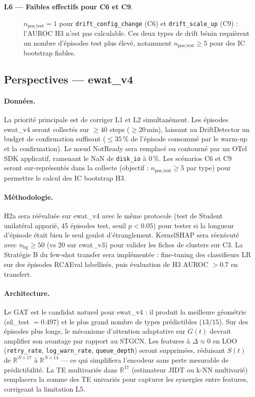 \begin{description}
  \item[\textbf{L6 --- Faibles effectifs pour C6 et C9}.]
    $n_\text{pos\_test} = 1$ pour \texttt{drift\_config\_change} (C6) et
    \texttt{drift\_scale\_up} (C9) : l'AUROC H3 n'est pas calculable.
    Ces deux types de drift bénin requièrent un nombre d'épisodes test plus élevé,
    notamment $n_\text{pos\_test} \geq 5$ pour des IC bootstrap fiables.
\end{description}

\subsection{Perspectives --- ewat\_v4}
\label{sec:ewat_v4}

\paragraph{Données.}
La priorité principale est de corriger L1 et L2 simultanément. Les épisodes ewat\_v4
seront collectés sur $\geq 40$ steps ($\geq 20$\,min), laissant au DriftDetector un
budget de confirmation suffisant ($\leq 35$\,\% de l'épisode consommé par le warm-up
et la confirmation). Le nœud NotReady sera remplacé ou contourné par un OTel SDK
applicatif, ramenant le NaN de \texttt{disk\_io} à $0$\,\%.
Les scénarios C6 et C9 seront sur-représentés dans la collecte (objectif :
$n_\text{pos\_test} \geq 5$ par type) pour permettre le calcul des IC bootstrap H3.

\paragraph{Méthodologie.}
H2a sera réévaluée sur ewat\_v4 avec le même protocole (test de Student unilatéral
apparié, 45 épisodes test, seuil $p < 0.05$) pour tester si la longueur d'épisode
était bien le seul goulot d'étranglement. KernelSHAP sera réexécuté avec $n_\text{bg} \geq 50$
(vs 20 sur ewat\_v3) pour valider les fiches de clusters sur C3.
La Stratégie B du few-shot transfer sera implémentée : fine-tuning des classifieurs LR
sur des épisodes RCAEval labellisés, puis évaluation de H3 AUROC $> 0.7$ en transfert.

\paragraph{Architecture.}
Le GAT est le candidat naturel pour ewat\_v4 : il produit la meilleure géométrie
(sil\_test $= 0.497$) et le plus grand nombre de types prédictibles ($13/15$).
Sur des épisodes plus longs, le mécanisme d'attention adaptative sur $G(t)$ devrait
amplifier son avantage par rapport au STGCN.
Les features à $\Delta \approx 0$ en LOO (\texttt{retry\_rate}, \texttt{log\_warn\_rate},
\texttt{queue\_depth}) seront supprimées, réduisant $S(t)$ de $\mathbb{R}^{N \times 17}$
à $\mathbb{R}^{N \times 14}$ --- ce qui simplifiera l'encodeur sans perte mesurable
de prédictibilité.
La TE multivariée dans $\mathbb{R}^{17}$ (estimateur JIDT ou k-NN multivarié)
remplacera la somme des TE univariés pour capturer les synergies entre features,
corrigeant la limitation L5.

